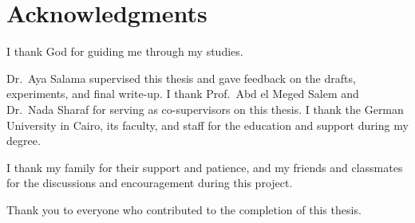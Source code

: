 \chapter*{Acknowledgments}
\label{chap:ack}
\pagestyle{plain}

I thank God for guiding me through my studies.

Dr.~Aya Salama supervised this thesis and gave feedback on the drafts, experiments, and final write-up. I thank Prof.~Abd el Meged Salem and Dr.~Nada Sharaf for serving as co-supervisors on this thesis. I thank the German University in Cairo, its faculty, and staff for the education and support during my degree.

I thank my family for their support and patience, and my friends and classmates for the discussions and encouragement during this project.

Thank you to everyone who contributed to the completion of this thesis.
